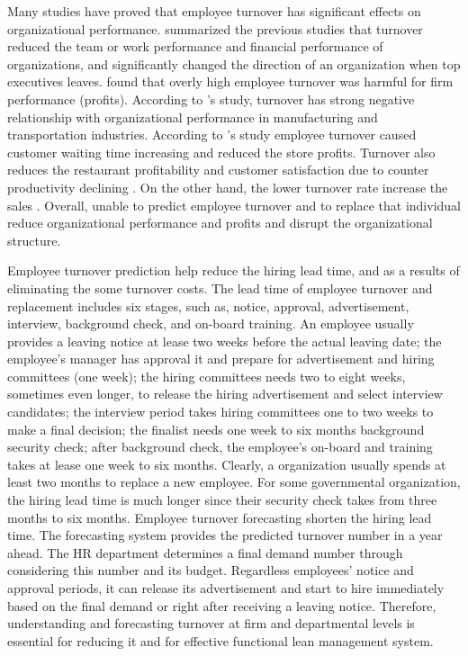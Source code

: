 Many studies have proved that employee turnover has significant effects on organizational performance. \citet{staw1980} summarized the previous studies that turnover reduced the team or work performance and financial performance of organizations, and significantly changed the direction of an organization when top executives leaves. \citet{glebbeek2004} found that overly high employee turnover was harmful for firm performance (profits). According to \citet{hancock2013}'s study, turnover has strong negative relationship with organizational performance in manufacturing and transportation industries. 
According to \citet{kacmar2006}'s study employee turnover caused customer waiting time increasing and reduced the store profits. Turnover also reduces the restaurant profitability and customer satisfaction due to counter productivity declining \citep{detert2007}. On the other hand, the lower turnover rate increase the sales \citep{batt2002}. Overall, unable to predict employee turnover and to replace that individual reduce organizational performance and profits and disrupt the organizational structure. 

Employee turnover prediction help reduce the hiring lead time, and as a results of eliminating the some turnover costs. The lead time of employee turnover and replacement includes six stages, such as, notice, approval, advertisement, interview, background check, and on-board training. An employee usually provides a leaving notice at lease two weeks before the actual leaving date; the employee's manager has approval it and prepare for advertisement and hiring committees (one week); the hiring committees needs two to eight weeks, sometimes even longer, to release the hiring advertisement and select interview candidates; the interview period takes hiring committees one to two weeks to make a final decision; the finalist needs one week to six months background security check; after background check, the employee's on-board and training takes at lease one week to six months. Clearly, a organization usually spends at least two months to replace a new employee. For some governmental organization, the hiring lead time is much longer since their security check takes from three months to six months. Employee turnover forecasting shorten the hiring lead time. The forecasting system provides the predicted turnover number in a year ahead. The HR department determines a final demand number through considering this number and its budget. Regardless employees' notice and approval periods, it can release its advertisement and start to hire immediately based on the final demand or right after receiving a leaving notice. Therefore, understanding and forecasting turnover at firm and departmental levels is essential for reducing it \citep{kacmar2006} and for effective functional lean management system. 
